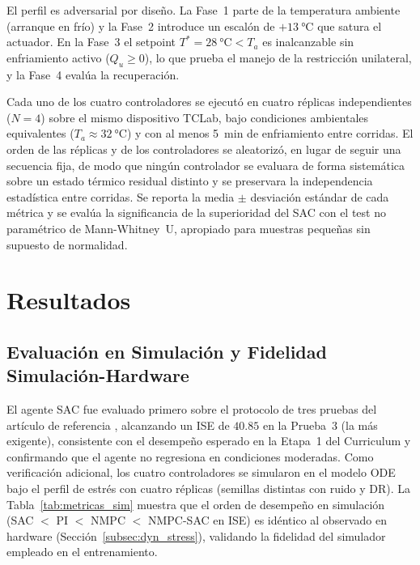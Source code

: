 \documentclass[processes,article,submit,moreauthors,pdftex]{Definitions/mdpi}
\newcommand{\Qu}{Q_u}
\newcommand{\Tref}{T^*}
\begin{document}
El perfil es adversarial por diseño. La Fase~1 parte de la temperatura
ambiente (arranque en frío) y la Fase~2 introduce un escalón de
$+\SI{13}{\celsius}$ que satura el actuador. En la Fase~3 el setpoint
$\Tref = \SI{28}{\celsius} < T_a$ es inalcanzable sin enfriamiento activo
($\Qu \geq 0$), lo que prueba el manejo de la restricción unilateral, y la
Fase~4 evalúa la recuperación.

Cada uno de los cuatro controladores se ejecutó en cuatro réplicas
independientes ($N=4$) sobre el mismo dispositivo TCLab, bajo condiciones
ambientales equivalentes ($T_a \approx \SI{32}{\celsius}$) y con al menos
\SI{5}{\minute} de enfriamiento entre corridas. El orden de las réplicas y de
los controladores se aleatorizó, en lugar de seguir una secuencia fija, de
modo que ningún controlador se evaluara de forma sistemática sobre un estado
térmico residual distinto y se preservara la independencia estadística entre
corridas. Se reporta la media $\pm$ desviación estándar de cada métrica y se
evalúa la significancia de la superioridad del SAC con el test no paramétrico
de Mann-Whitney~U, apropiado para muestras pequeñas sin supuesto de
normalidad.


\section{Resultados}
\label{sec:results}

\subsection{Evaluación en Simulación y Fidelidad Simulación-Hardware}
\label{subsec:sim_eval}

El agente SAC fue evaluado primero sobre el protocolo de tres pruebas del
artículo de referencia \cite{SozaMamani2025}, alcanzando un ISE de $40.85$ en
la Prueba~3 (la más exigente), consistente con el desempeño esperado en la Etapa~1 del
Curriculum y confirmando que el agente no regresiona en condiciones
moderadas. Como verificación adicional, los cuatro controladores se
simularon en el modelo ODE bajo el perfil de estrés con cuatro réplicas
(semillas distintas con ruido y DR). La Tabla~\ref{tab:metricas_sim}
muestra que el orden de desempeño en simulación
(SAC $<$ PI $<$ NMPC $<$ NMPC-SAC en ISE) es idéntico al observado en
hardware (Sección~\ref{subsec:dyn_stress}), validando la fidelidad del
simulador empleado en el entrenamiento.
\end{document}
